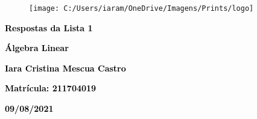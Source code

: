 \documentclass[paper=a4]{article}
\begin{document}
	\thispagestyle{empty}
	\begin{figure}
		\centering
		\texttt{[image: C:/Users/iaram/OneDrive/Imagens/Prints/logo]}
		\label{fig:logo}
	\end{figure}
	\vspace{7cm}
	\begin{center}	
		\textcolor{black}{{\Huge{\bf Respostas da Lista 1}}} \\	
	\end{center}
	\vspace{0,2cm}
	\begin{center}
		\textcolor{black}{{\Huge{\bf Álgebra Linear}}}
	\end{center}
	\vspace{0,8cm}	
	\begin{center}
		\textcolor{black}{{\LARGE{\bf Iara Cristina Mescua Castro}}} \\
	\end{center}
	\vspace{0,2cm}
	\begin{center}
		\textcolor{black}{{\Large{\bf Matrícula: 211704019}}}
	\end{center}
	\vspace{0,5cm}
	\begin{center}
		\textcolor{black}{\Large{\bf 09/08/2021}}
	\end{center}
	
	\newpage
	\thispagestyle{empty}
	\tableofcontents
	\newpage
	\thispagestyle{empty}
	\newpage
	\setcounter{page}{1}
	
\end{document}
